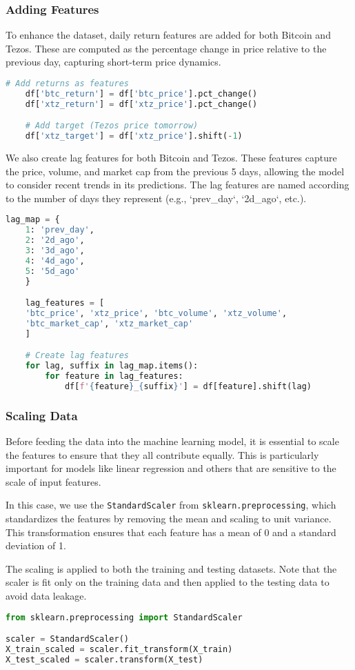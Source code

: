 \subsubsection{Adding Features}
To enhance the dataset, daily return features are added for both Bitcoin and Tezos. These are computed as the percentage change in price relative to the previous day, capturing short-term price dynamics.
\begin{lstlisting}[language=Python, caption={Adding features}, label={lst:add-features}]
    # Add returns as features
    df['btc_return'] = df['btc_price'].pct_change()
    df['xtz_return'] = df['xtz_price'].pct_change()

    # Add target (Tezos price tomorrow)
    df['xtz_target'] = df['xtz_price'].shift(-1)
\end{lstlisting}

We also create lag features for both Bitcoin and Tezos. These features capture the price, volume, and market cap from the previous 5 days, allowing the model to consider recent trends in its predictions. The lag features are named according to the number of days they represent (e.g., `prev\_day`, `2d\_ago`, etc.).
\begin{lstlisting}[language=Python, caption={Adding features}, label={lst:add-lag-features}]
    lag_map = {
    1: 'prev_day',
    2: '2d_ago',
    3: '3d_ago',
    4: '4d_ago',
    5: '5d_ago'
    }

    lag_features = [
    'btc_price', 'xtz_price', 'btc_volume', 'xtz_volume',
    'btc_market_cap', 'xtz_market_cap'
    ]

    # Create lag features
    for lag, suffix in lag_map.items():
        for feature in lag_features:
            df[f'{feature}_{suffix}'] = df[feature].shift(lag)
\end{lstlisting}



\subsubsection{Scaling Data}
Before feeding the data into the machine learning model, it is essential to scale the features to ensure that they all contribute equally. This is particularly important for models like linear regression and others that are sensitive to the scale of input features.

In this case, we use the \texttt{StandardScaler} from \texttt{sklearn.preprocessing}, which standardizes the features by removing the mean and scaling to unit variance. This transformation ensures that each feature has a mean of 0 and a standard deviation of 1.

The scaling is applied to both the training and testing datasets. Note that the scaler is fit only on the training data and then applied to the testing data to avoid data leakage.

\begin{lstlisting}[language=Python, caption={Scaling}, label={lst:Scaling}]
from sklearn.preprocessing import StandardScaler

scaler = StandardScaler()
X_train_scaled = scaler.fit_transform(X_train)
X_test_scaled = scaler.transform(X_test)
\end{lstlisting}
